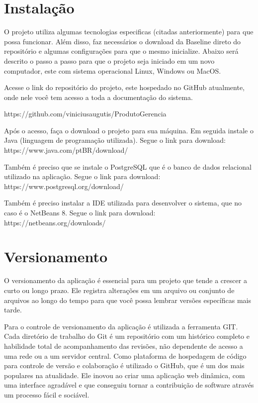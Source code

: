 \documentclass[	DIV=calc,%
							paper=a4,%
							fontsize=12pt,%
							onecolumn]{scrartcl}	 					%
\begin{document}
\section{Instalação}
O projeto utiliza algumas tecnologias especificas (citadas
anteriormente) para que possa funcionar. Além disso, faz necessários o download da Baseline direto do
repositório e algumas configurações para que o mesmo inicialize.
Abaixo será descrito o passo a passo para que o projeto seja iniciado em um novo computador,
este com sistema operacional Linux, Windows ou MacOS. 

Acesse o link do repositório do projeto, este hospedado no GitHub atualmente, onde nele você tem acesso a toda a documentação do sistema.

https://github.com/viniciusaugutis/ProdutoGerencia

Após o acesso, faça o download o projeto para sua máquina.
Em seguida instale o Java (linguagem de programação utilizada). Segue o link para download: 
https://www.java.com/ptBR/download/

Também é preciso que se instale o PostgreSQL que é o banco de dados relacional utilizado na aplicação. Segue o link para download: https://www.postgresql.org/download/

Também é preciso instalar a IDE utilizada para desenvolver o sistema, que no caso é o NetBeans 8. Segue o link para download:
https://netbeans.org/downloads/


\section{Versionamento}

O versionamento da aplicação é essencial para um projeto que tende a crescer a curto ou longo
prazo. Ele registra alterações em um arquivo ou conjunto de arquivos ao longo do tempo para que você
possa lembrar versões específicas mais tarde.

Para o controle de versionamento da aplicação é utilizada a ferramenta GIT. Cada diretório de
trabalho do Git é um repositório com um histórico completo e habilidade total de acompanhamento das
revisões, não dependente de acesso a uma rede ou a um servidor central.
Como plataforma de hospedagem de código para controle de versão e colaboração é utilizado o
GitHub, que é um dos mais populares na atualidade. Ele inovou ao criar uma aplicação web dinâmica,
com uma interface agradável e que conseguiu tornar a contribuição de software através um processo
fácil e sociável.
\end{document}
